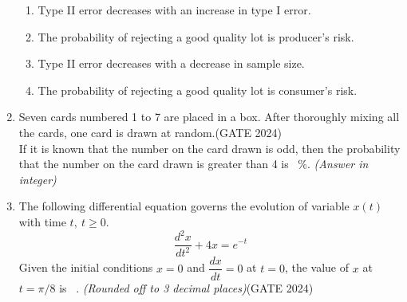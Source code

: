 \documentclass[journal,12pt,onecolumn]{IEEEtran}
\theoremstyle{remark}
\begin{document}
\begin{enumerate}
\begin{enumerate}
    \item Type II error decreases with an increase in type I error.
    \item The probability of rejecting a good quality lot is producer's risk.
    \item Type II error decreases with a decrease in sample size.
    \item The probability of rejecting a good quality lot is consumer's risk.
\end{enumerate}

\vspace{1cm}

\item Seven cards numbered 1 to 7 are placed in a box. After thoroughly mixing all the cards, one card is drawn at random.\hfill{(GATE 2024)}\\
If it is known that the number on the card drawn is odd, then the probability that the number on the card drawn is greater than 4 is \underline{\hspace{2cm}}~\%. \textit{(Answer in integer)}
\vspace{1cm}

\item The following differential equation governs the evolution of variable $x(t)$ with time $t,~t \geq 0$.
\[
\dfrac{d^2x}{dt^2} + 4x = e^{-t}
\]
Given the initial conditions $x=0$ and $\dfrac{dx}{dt}=0$ at $t=0$, the value of $x$ at $t=\pi/8$ is \underline{\hspace{2cm}}~. \textit{(Rounded off to 3 decimal places)}\hfill{(GATE 2024)}
\vspace{1cm}


\end{enumerate}
\end{document}
